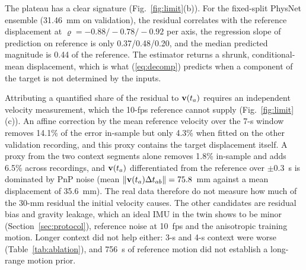 \begin{table}[t]
\end{table}

The plateau has a clear signature (Fig.~\ref{fig:limit}(b)). For the fixed-split
PhysNet ensemble (31.46~mm on validation), the residual correlates with the
reference displacement at $\varrho=-0.88/-0.78/-0.92$ per axis, the regression
slope of prediction on reference is only 0.37/0.48/0.20, and the median
predicted magnitude is 0.44 of the reference. The estimator returns a shrunk,
conditional-mean displacement, which is what (\ref{eq:decomp}) predicts when a
component of the target is not determined by the inputs.

Attributing a quantified share of the residual to ${\bf v}(t_a)$ requires an
independent velocity measurement, which the 10-fps reference cannot supply
(Fig.~\ref{fig:limit}(c)). An affine correction by the mean reference velocity
over the 7-s window removes 14.1\% of the error in-sample but only 4.3\% when
fitted on the other validation recording, and this proxy contains the target
displacement itself. A proxy from the two context segments alone removes
1.8\% in-sample and adds 6.5\% across recordings, and ${\bf v}(t_a)$
differentiated from the reference over $\pm0.3$~s is dominated by PnP noise
(mean $\|{\bf v}(t_a)\Delta t_{ab}\|=75.8$~mm against a mean displacement of
35.6~mm). The real data therefore do not measure how much of the 30-mm residual
the initial velocity causes. The other candidates are residual bias and
gravity leakage, which an ideal IMU in the twin shows to be minor
(Section~\ref{sec:protocol}), reference noise at 10~fps and the anisotropic
training motion. Longer context did not help either: 3-s and 4-s context were
worse (Table~\ref{tab:ablation}), and 756~s of reference motion did not
establish a long-range motion prior.

